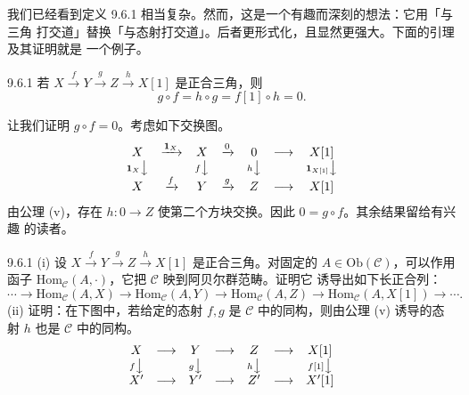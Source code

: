 
我们已经看到定义 9.6.1 相当复杂。然而，这是一个有趣而深刻的想法：它用「与三角
打交道」替换「与态射打交道」。后者更形式化，且显然更强大。下面的引理及其证明就是
一个例子。

\begin{wlem}{9.6.1}
若 $X\xrightarrow{f}Y\xrightarrow{g}Z\xrightarrow{h}X[1]$ 是正合三角，则
\[
g\circ f=h\circ g=f[1]\circ h=0.
\]
\end{wlem}

\begin{wproof}
让我们证明 $g\circ f=0$。考虑如下交换图。
\[
\begin{array}{ccccccc}
X & \xrightarrow{\mathbf 1_X} & X & \xrightarrow{0} & 0 & \longrightarrow & X[1]\\
{\scriptstyle\mathbf 1_X}\big\downarrow & &
{\scriptstyle f}\big\downarrow & &
{\scriptstyle h}\big\downarrow & &
{\scriptstyle\mathbf 1_{X[1]}}\big\downarrow\\
X & \xrightarrow{f} & Y & \xrightarrow{g} & Z & \longrightarrow & X[1]
\end{array}
\]
由公理 (v)，存在 $h:0\to Z$ 使第二个方块交换。因此 $0=g\circ f$。其余结果留给有兴趣
的读者。
\end{wproof}


\begin{wexer}{9.6.1}
(i) 设 $X\xrightarrow{f}Y\xrightarrow{g}Z\xrightarrow{h}X[1]$ 是正合三角。对固定的
$A\in\mathrm{Ob}(\mathcal C)$，可以作用函子
$\mathrm{Hom}_{\mathcal C}(A,\cdot)$，它把 $\mathcal C$ 映到阿贝尔群范畴。证明它
诱导出如下长正合列：
\[
\cdots\to\mathrm{Hom}_{\mathcal C}(A,X)\to\mathrm{Hom}_{\mathcal C}(A,Y)
\to\mathrm{Hom}_{\mathcal C}(A,Z)\to\mathrm{Hom}_{\mathcal C}(A,X[1])\to\cdots.
\]
(ii) 证明：在下图中，若给定的态射 $f,g$ 是 $\mathcal C$ 中的同构，则由公理 (v)
诱导的态射 $h$ 也是 $\mathcal C$ 中的同构。
\[
\begin{array}{ccccccc}
X & \longrightarrow & Y & \longrightarrow & Z & \longrightarrow & X[1]\\
{\scriptstyle f}\big\downarrow & &
{\scriptstyle g}\big\downarrow & &
{\scriptstyle h}\big\downarrow & &
{\scriptstyle f[1]}\big\downarrow\\
X' & \longrightarrow & Y' & \longrightarrow & Z' & \longrightarrow & X'[1]
\end{array}
\]
\end{wexer}

